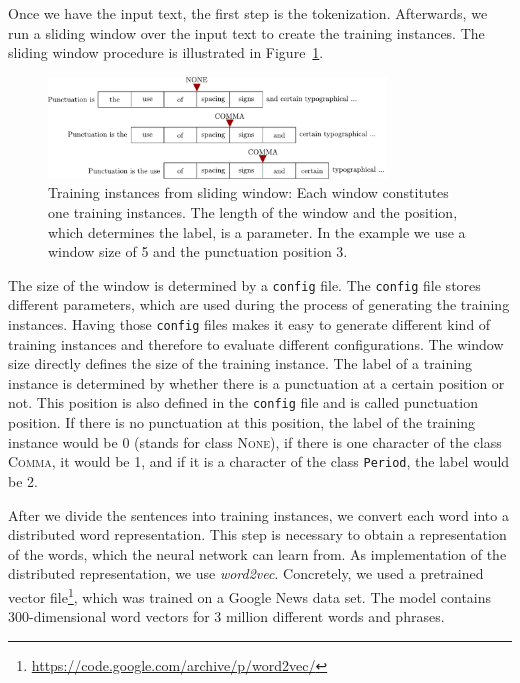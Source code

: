 Once we have the input text, the first step is the tokenization.
Afterwards, we run a sliding window over the input text to create the training instances.
The sliding window procedure is illustrated in Figure~\ref{fig:sliding_window}.
\begin{figure}[ht]
    \centering
    \includegraphics[width=0.8\textwidth]{img/sliding_window.pdf}
    \caption{Training instances from sliding window: Each window constitutes one training instances. The length of the window and the position, which determines the label, is a parameter. In the example we use a window size of 5 and the punctuation position 3.}
    \label{fig:sliding_window}
\end{figure}
The size of the window is determined by a \texttt{config} file.
The \texttt{config} file stores different parameters, which are used during the process of generating the training instances.
Having those \texttt{config} files makes it easy to generate different kind of training instances and therefore to evaluate different configurations.
The window size directly defines the size of the training instance.
The label of a training instance is determined by whether there is a punctuation at a certain position or not.
This position is also defined in the \texttt{config} file and is called punctuation position.
If there is no punctuation at this position, the label of the training instance would be 0 (stands for class \textsc{None}), if there is one character of the class \textsc{Comma}, it would be 1, and if it is a character of the class \texttt{Period}, the label would be 2.

After we divide the sentences into training instances, we convert each word into a distributed word representation.
This step is necessary to obtain a representation of the words, which the neural network can learn from.
As implementation of the distributed representation, we use \emph{word2vec}\cite{Mikolov1, Mikolov2, Mikolov3}.
Concretely, we used a pretrained vector file\footnote{\url{https://code.google.com/archive/p/word2vec/}}, which was trained on a Google News data set.
The model contains 300-dimensional word vectors for 3 million different words and phrases.

